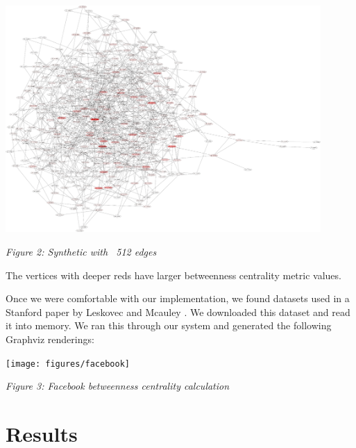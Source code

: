 \documentclass[11pt,a4paper,titlepage]{article}
\begin{document}
\begin{center}
\includegraphics[width=0.9\textwidth]{figures/synthetic512_1}
\end{center}
\begin{center}
\textit{Figure 2: Synthetic with ~512 edges}
\end{center}

The vertices with deeper reds have larger betweenness centrality metric values.

Once we were comfortable with our implementation, we found datasets used in a
Stanford paper by Leskovec and Mcauley \cite{leskovec2012learning}. We
downloaded this dataset and read it into memory. We ran this through our system
and generated the following Graphviz renderings:

\begin{center}
\texttt{[image: figures/facebook]}
\end{center}
\begin{center}
\textit{Figure 3: Facebook betweenness centrality calculation}
\end{center}



\section{Results} %
\label{sec:results}
\end{document}
